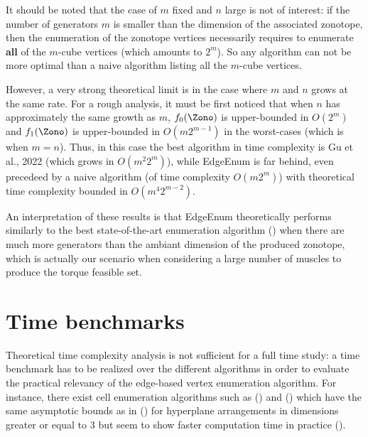 It should be noted that the case of $m$ fixed and $n$ large is not of interest: if the number of generators $m$ is smaller than the dimension of the associated zonotope, then the enumeration of the zonotope vertices necessarily requires to enumerate \textbf{all} of the $m$-cube vertices (which amounts to $2^m$). So any algorithm can not be more optimal than a naive algorithm listing all the $m$-cube vertices.

However, a very strong theoretical limit is in the case where $m$ and $n$ grows at the same rate. For a rough analysis, it must be first noticed that when $n$ has approximately the same growth as $m$, $f_0(\Zono)$ is upper-bounded in $O(2^m)$ and $f_1(\Zono)$ is upper-bounded in $O(m2^{m-1})$ in the worst-cases (which is when $m=n$).
Thus, in this case the best algorithm in time complexity is Gu et al., 2022 (which grows in $O(m^2 2^m)$), while EdgeEnum is far behind, even precedeed by a naive algorithm (of time complexity $O(m2^m)$) with theoretical time complexity bounded in $O(m^4 2^{m-2})$.

An interpretation of these results is that EdgeEnum theoretically performs similarly to the best state-of-the-art enumeration algorithm (\cite{guCounterfactualIdentificationLatent2022}) when there are much more generators than the ambiant dimension of the produced zonotope, which is actually our scenario when considering a large number of muscles to produce the torque feasible set.

\section{Time benchmarks}
\label{time_benchmark}

Theoretical time complexity analysis is not sufficient for a full time study: a time benchmark has to be realized over the different algorithms in order to evaluate the practical relevancy of the edge-based vertex enumeration algorithm.
For instance, there exist cell enumeration algorithms such as (\cite{radaNewAlgorithmEnumeration2018}) and (\cite{guNonparametricMaximumLikelihood2020}) which have the same asymptotic bounds as in (\cite{avisPivotingAlgorithmConvex}) for hyperplane arrangements in dimensions greater or equal to $3$ but seem to show faster computation time in practice (\cite{guCounterfactualIdentificationLatent2022}).

